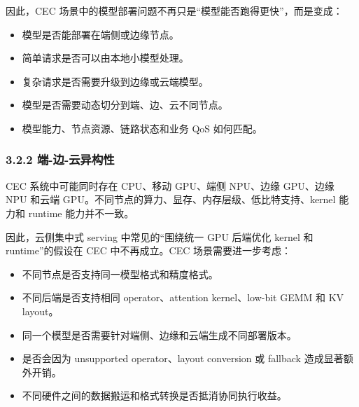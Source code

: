 \documentclass[a4paper,10pt]{ctexart}
\begin{document}
因此，CEC 场景中的模型部署问题不再只是“模型能否跑得更快”，而是变成：




\begin{itemize}
\item 模型是否能部署在端侧或边缘节点。

\item 简单请求是否可以由本地小模型处理。

\item 复杂请求是否需要升级到边缘或云端模型。

\item 模型是否需要动态切分到端、边、云不同节点。

\item 模型能力、节点资源、链路状态和业务 QoS 如何匹配。



\end{itemize}




\subsubsection*{3.2.2 端-边-云异构性}



CEC 系统中可能同时存在 CPU、移动 GPU、端侧 NPU、边缘 GPU、边缘 NPU 和云端 GPU。不同节点的算力、显存、内存层级、低比特支持、kernel 能力和 runtime 能力并不一致。




因此，云侧集中式 serving 中常见的“围绕统一 GPU 后端优化 kernel 和 runtime”的假设在 CEC 中不再成立。CEC 场景需要进一步考虑：




\begin{itemize}
\item 不同节点是否支持同一模型格式和精度格式。

\item 不同后端是否支持相同 operator、attention kernel、low-bit GEMM 和 KV layout。

\item 同一个模型是否需要针对端侧、边缘和云端生成不同部署版本。

\item 是否会因为 unsupported operator、layout conversion 或 fallback 造成显著额外开销。

\item 不同硬件之间的数据搬运和格式转换是否抵消协同执行收益。



\end{itemize}
\end{document}
